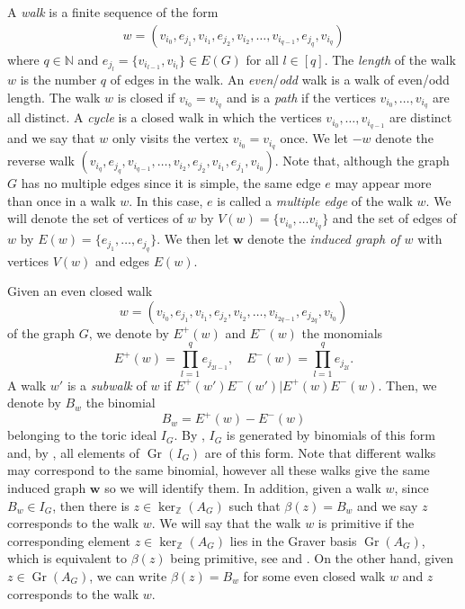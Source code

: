 \documentclass[a4paper, 12pt]{article}
\newcommand{\NN}{\mathbb N}
\newcommand{\ZZ}{\mathbb Z}
\theoremstyle{plain}
\theoremstyle{definition}
\theoremstyle{remark}
\begin{document}
A \textit{walk} is a finite sequence of the form
\begin{align*}
    w=(v_{i_0},e_{j_1},v_{i_1},e_{j_2},v_{i_2},\dots ,v_{i_{q-1}},e_{j_q},v_{i_{q}})
\end{align*}
where $q \in \NN$ and $e_{j_l}=\{v_{i_{l-1}},v_{i_l} \} \in E(G)$ for all $l \in [q]$. The \textit{length} of the walk $w$ is the number $q$ of edges in the walk. An \textit{even}/\textit{odd} walk is a walk of even/odd length. The walk $w$ is closed if $v_{i_0}=v_{i_q}$ and is a \textit{path} if the vertices $v_{i_0},\dots ,v_{i_q}$ are all distinct. A \textit{cycle} is a closed walk in which the vertices $v_{i_0},\dots ,v_{i_{q-1}}$ are distinct and we say that $w$ only visits the vertex $v_{i_0}=v_{i_q}$ once. We let $-w$ denote the reverse walk $(v_{i_{q}},e_{j_q},v_{i_{q-1}},\dots,v_{i_2},e_{j_2},v_{i_1},e_{j_1},v_{i_0} )$. Note that, although the graph $G$ has no multiple edges since it is simple, the same edge $e$ may appear more than once in a walk $w$. In this case, $e$ is called a \textit{multiple edge} of the walk $w$. We will denote the set of vertices of $w$ by $V(w)=\{v_{i_0},\dots v_{i_{q}}\}$ and the set of edges of $w$ by $E(w)=\{e_{j_1},\dots , e_{j_q}\}$. We then let $\mathbf{w}$ denote the \textit{induced graph of $w$} with vertices $V(w)$ and edges $E(w)$. 

Given an even closed walk
$$w=(v_{i_0},e_{j_1},v_{i_1},e_{j_2},v_{i_2},\dots ,v_{i_{2q-1}},e_{j_{2q}},v_{i_0})$$
of the graph $G$, we denote by $E^+(w)$ and $E^-(w)$ the monomials
$$E^+(w)=\prod_{l=1}^q e_{j_{2l-1}}, \quad E^-(w)=\prod_{l=1}^q e_{j_{2l}}.$$
A walk $w'$ is a \textit{subwalk} of $w$ if $E^+(w')E^-(w')| E^+(w)E^-(w)$. Then, we denote by $B_w$ the binomial
$$B_w=E^+(w)-E^-(w)$$
belonging to the toric ideal $I_G$. By  \cite[Proposition 3.1]{Vil_1995}, $I_G$ is generated by binomials of this form and, by \cite[Lemma 2.1]{ohsugi-hibi-quad-binoms}, all elements of $\operatorname{Gr}(I_G)$ are of this form. Note that different walks may correspond to the same binomial, however all these walks give the same induced graph $\mathbf{w}$ so we will identify them. In addition, given a walk $w$, since $B_w \in I_{G}$, then there is $z \in \ker_\ZZ(A_G)$ such that $\beta(z)=B_w$ and we say $z$ corresponds to the walk $w$. We will say that the walk $w$ is primitive if the corresponding element $z \in \ker_\ZZ(A_G)$ lies in the Graver basis $\operatorname{Gr}(A_G)$, which is equivalent to $\beta(z)$ being primitive, see \cite[Chapter 4]{sturmfels1996grobner} and \cite[Lemmas~1.1 and 3.1]{ohsugi-hibi-quad-binoms}. On the other hand, given $z \in \operatorname{Gr}(A_G)$, we can write $\beta(z)=B_w$ for some even closed walk $w$ and $z$ corresponds to the walk $w$. %
\end{document}
